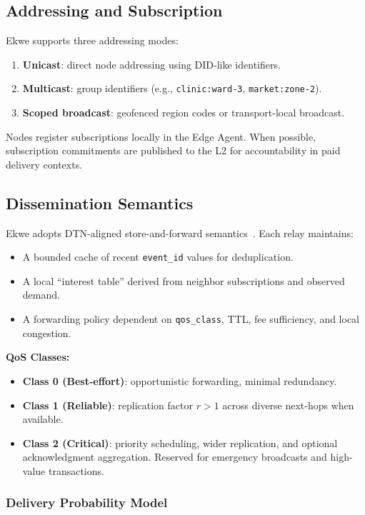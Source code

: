 \documentclass[11pt,a4paper]{article}
\begin{document}
\subsection{Addressing and Subscription}

Ekwe supports three addressing modes:
\begin{enumerate}[nosep]
  \item \textbf{Unicast}: direct node addressing using DID-like identifiers.
  \item \textbf{Multicast}: group identifiers (e.g., \texttt{clinic:ward-3}, \texttt{market:zone-2}).
  \item \textbf{Scoped broadcast}: geofenced region codes or transport-local broadcast.
\end{enumerate}

Nodes register subscriptions locally in the Edge Agent. When possible, subscription commitments are published to the L2 for accountability in paid delivery contexts.

\subsection{Dissemination Semantics}

Ekwe adopts DTN-aligned store-and-forward semantics~\cite{rfc4838}. Each relay maintains:
\begin{itemize}[nosep]
  \item A bounded cache of recent \texttt{event\_id} values for deduplication.
  \item A local ``interest table'' derived from neighbor subscriptions and observed demand.
  \item A forwarding policy dependent on \texttt{qos\_class}, TTL, fee sufficiency, and local congestion.
\end{itemize}

\textbf{QoS Classes:}
\begin{itemize}[nosep]
  \item \textbf{Class 0 (Best-effort)}: opportunistic forwarding, minimal redundancy.
  \item \textbf{Class 1 (Reliable)}: replication factor $r > 1$ across diverse next-hops when available.
  \item \textbf{Class 2 (Critical)}: priority scheduling, wider replication, and optional acknowledgment aggregation. Reserved for emergency broadcasts and high-value transactions.
\end{itemize}

\subsubsection{Delivery Probability Model}
\end{document}
